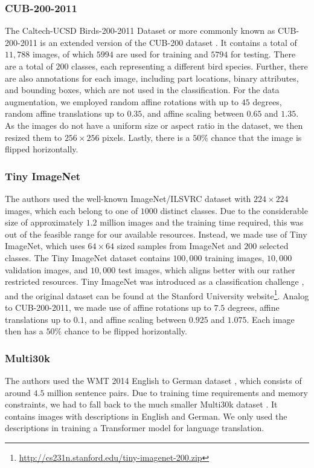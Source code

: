 \subsubsection{CUB-200-2011} \label{cub200}
The Caltech-UCSD Birds-200-2011 Dataset \cite{wah2011} or more commonly known as CUB-200-2011 is an extended version of the CUB-200 dataset \cite{welinder2010}. It contains a total of $11,788$ images, of which $5994$ are used for training and $5794$ for testing. There are a total of $200$ classes, each representing a different bird species. Further, there are also annotations for each image, including part locations, binary attributes, and bounding boxes, which are not used in the classification. For the data augmentation, we employed random affine rotations with up to $45$ degrees, random affine translations up to $0.35$, and affine scaling between $0.65$ and $1.35$. As the images do not have a uniform size or aspect ratio in the dataset, we then resized them to $256 \times 256$ pixels. Lastly, there is a $50\%$ chance that the image is flipped horizontally.

\subsubsection{Tiny ImageNet} \label{imagenet}
The authors used the well-known ImageNet/ILSVRC dataset with $224\times224$ images, which each belong to one of $1000$ distinct classes. Due to the considerable size of approximately $1.2$ million images and the training time required, this was out of the feasible range for our available resources. Instead, we made use of Tiny ImageNet, which uses $64 \times 64$ sized samples from ImageNet and $200$ selected classes. The Tiny ImageNet dataset contains $100,000$ training images, $10,000$ validation images, and $10,000$ test images, which aligns better with our rather restricted resources. Tiny ImageNet was introduced as a classification challenge \cite{ali2017}, and the original dataset can be found at the Stanford University website\footnote{\url{http://cs231n.stanford.edu/tiny-imagenet-200.zip}}.
Analog to CUB-200-2011, we made use of affine rotations up to $7.5$ degrees, affine translations up to $0.1$, and affine scaling between $0.925$ and $1.075$. Each image then has a $50\%$ chance to be flipped horizontally.

\subsubsection{Multi30k} \label{multi30k}
The authors used the WMT 2014 English to German dataset \cite{bojar2014}, which consists of around $4.5$ million sentence pairs. Due to training time requirements and memory constraints, we had to fall back to the much smaller Multi30k dataset \cite{elliott2016}. It contains images with descriptions in English and German. We only used the descriptions in training a Transformer model for language translation. 

